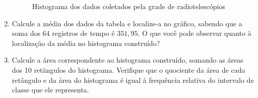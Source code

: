 \documentclass[10 pt,usenames,dvipsnames, oneside]{article}
\begin{document}
\begin{enumerate}
\begin{figure}[H]
\caption{Histograma dos dados coletados pela grade de radiotelescópios}
\label{est1-fig-10}
\end{figure}

\item Calcule a média dos dados da tabela e localize-a no gráfico, sabendo que a soma dos 64 registros de tempo é $351{,}95$. O que você pode observar quanto à localização da média no histograma construído?

\item Calcule a área correspondente ao histograma construído, somando as áreas dos 10 retângulos do histograma. Verifique que o quociente da área de cada retângulo e da área do histograma é igual à frequência relativa do intervalo de classe que ele representa.

\end{enumerate}
\end{document}

